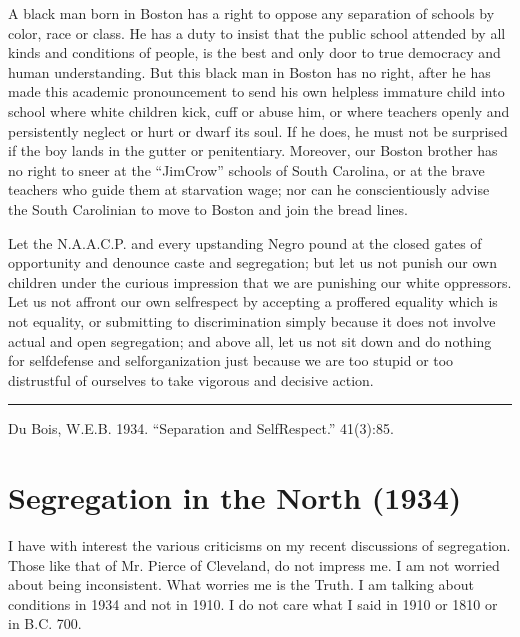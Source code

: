\documentclass[letterpaper,10pt,english]{jupyterBook}
\begin{document}
\sphinxAtStartPar
A black man born in Boston has a right to oppose any separation of schools by color, race or class. He has a duty to insist that the public school attended by all kinds and conditions of people, is the best and only door to true democracy and human understanding. But this black man in Boston has no right, after he has made this academic pronouncement to send his own helpless immature child into school where white children kick, cuff or abuse him, or where teachers openly and persistently neglect or hurt or dwarf its soul. If he does, he must not be surprised if the boy lands in the gutter or penitentiary. Moreover, our Boston brother has no right to sneer at the “Jim\sphinxhyphen{}Crow” schools of South Carolina, or at the brave teachers who guide them at starvation wage; nor can he conscientiously advise the South Carolinian to move to Boston and join the bread lines.

\sphinxAtStartPar
Let the N.A.A.C.P. and every upstanding Negro pound at the closed gates of opportunity and denounce caste and segregation; but let us not punish our own children under the curious impression that we are punishing our white oppressors. Let us not affront our own self\sphinxhyphen{}respect by accepting a proffered equality which is not equality, or submitting to discrimination simply because it does not involve actual and open segregation; and above all, let us not sit down and do nothing for self\sphinxhyphen{}defense and self\sphinxhyphen{}organization just because we are too stupid or too distrustful of ourselves to take vigorous and decisive action.


\bigskip\hrule\bigskip


\sphinxAtStartPar
{} Du Bois, W.E.B. 1934. “Separation and Self\sphinxhyphen{}Respect.” 41(3):85.


\section{Segregation in the North (1934)}
\label{\detokenize{Volumes/41/04/segregation_in_the_north:segregation-in-the-north-1934}}\label{\detokenize{Volumes/41/04/segregation_in_the_north::doc}}
\sphinxAtStartPar
I have with interest the various criticisms on my recent discussions of segregation. Those like that of Mr. Pierce of Cleveland, do not impress me. I am not worried about being inconsistent. What worries me is the Truth. I am talking about conditions in 1934 and not in 1910. I do not care what I said in 1910 or 1810 or in B.C. 700.
\end{document}
